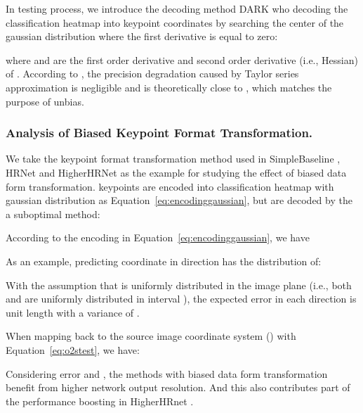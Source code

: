 \documentclass[10pt,journal,compsoc]{IEEEtran}
\begin{document}
In testing process, we introduce the decoding method DARK \cite{DARK} who decoding the classification heatmap into keypoint coordinates by searching the center of the gaussian distribution where the first derivative is equal to zero:

where  and  are the first order derivative and second order derivative (i.e., Hessian) of . According to \cite{DARK}, the precision degradation caused by Taylor series approximation is negligible and  is theoretically close to , which matches the purpose of unbias.

\subsubsection{Analysis of Biased Keypoint Format Transformation.}
We take the keypoint format transformation method used in SimpleBaseline \cite{SBNet}, HRNet \cite{HRNet} and HigherHRNet \cite{Higher} as the example for studying the effect of biased data form transformation. keypoints are encoded into classification heatmap with gaussian distribution as Equation~\ref{eq:encodinggaussian}, but are decoded by the a suboptimal method:

According to the encoding in Equation~\ref{eq:encodinggaussian}, we have

As an example, predicting coordinate in  direction has the distribution of:

With the assumption that  is uniformly distributed in the image plane (i.e., both  and  are uniformly distributed in interval ), the expected error in each direction is  unit length with a variance of .

When mapping  back to the source image coordinate system () with Equation~\ref{eq:o2stest}, we have:

Considering error  and , the methods with biased data form transformation benefit from higher network output resolution. And this also contributes part of the performance boosting in HigherHRnet \cite{Higher}.
\end{document}
